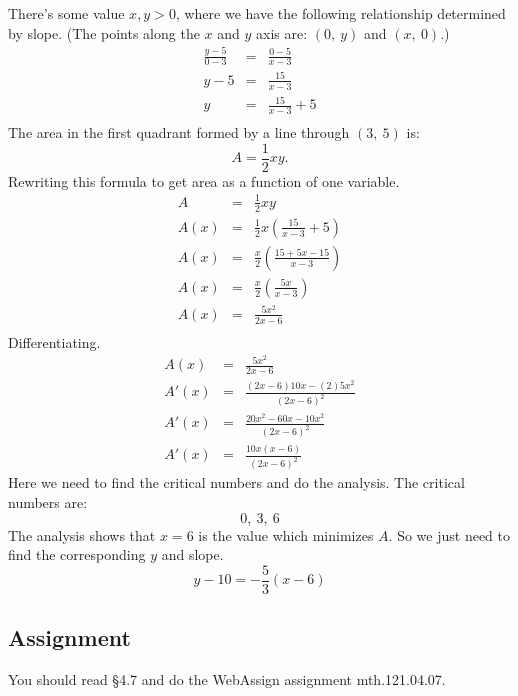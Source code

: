 \documentclass[12pt,addpoints, answers, fleqn]{exam}
\begin{document}
\begin{questions}
\begin{solution}
There's some value $x, y > 0$, where we have the following relationship determined by slope. (The points along the $x$ and $y$ axis are: $\left( 0, \ y \right)$ and $\left( x, \ 0 \right)$.)
\begin{eqnarray*}
\frac{y-5}{0-3} &=& \frac{0-5}{x-3}\\
y-5 &=& \frac{15}{x-3}\\
y &=& \frac{15}{x-3} + 5\\
\end{eqnarray*}
The area in the first quadrant formed by a line through $\left( 3, \ 5 \right)$ is:
\[
A = \frac{1}{2}xy.
\]
Rewriting this formula to get area as a function of one variable.
\begin{eqnarray*}
A &=& \frac{1}{2}xy\\
A\left( x \right) &=& \frac{1}{2}x\left(\frac{15}{x-3} + 5\right)\\
A\left( x \right) &=& \frac{x}{2}\left(\frac{15+ 5x -15}{x-3}\right)\\
A\left( x \right) &=& \frac{x}{2}\left(\frac{5x}{x-3}\right)\\
A\left( x \right) &=& \frac{5x^2}{2x-6}\\
\end{eqnarray*}
Differentiating.
\begin{eqnarray*}
A\left( x \right) &=& \frac{5x^2}{2x-6}\\
A'\left( x \right) &=& \frac{\left(2x-6\right)10x-\left(2\right)5x^2}{\left(2x-6\right)^2}\\
A'\left( x \right) &=& \frac{20x^2-60x-10x^2}{\left(2x-6\right)^2}\\
A'\left( x \right) &=& \frac{10x\left(x-6\right)}{\left(2x-6\right)^2}
\end{eqnarray*}
Here we need to find the critical numbers and do the analysis. The critical numbers are:
\[
0, \ 3, \ 6
\]
The analysis shows that $x=6$ is the value which minimizes $A$. So we just need to find the corresponding $y$ and slope.
\[
y - 10 = -\frac{5}{3} \left( x - 6\right)
\]
\end{solution}



\end{questions}











\subsection{Assignment}
You should read \S  4.7 and do the WebAssign assignment mth.121.04.07.
\vfill
\pagebreak
\end{document}
